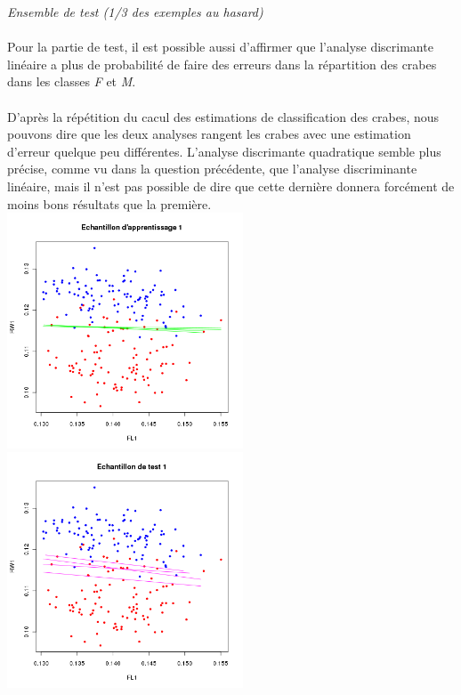 \documentclass[a4paper, 10pt]{article}
\begin{document}
\textit{Ensemble de test (1/3 des exemples au hasard)}\\ \\
Pour la partie de test, il est possible aussi d'affirmer que l'analyse discrimante linéaire a plus de probabilité de faire des erreurs
dans la répartition des crabes dans les classes \textit{F} et \textit{M}.\\ \\
D'après la répétition du cacul des estimations de classification des crabes, nous pouvons dire que les deux analyses rangent les crabes
avec une estimation d'erreur quelque peu différentes.
L'analyse discrimante quadratique semble plus précise, comme vu dans la question précédente, que l'analyse discriminante linéaire,
mais il n'est pas possible de dire que cette dernière donnera forcément de moins bons résultats que la première.\\
\includegraphics[height = 7cm, width = 7cm]{plots/exo2_a_10.png}
\includegraphics[height = 7cm, width = 7cm]{plots/exo2_a_11.png}\\

\newpage
\end{document}
